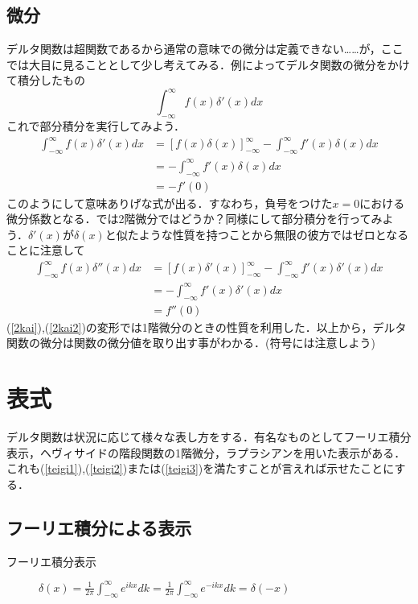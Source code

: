 \documentclass{jsarticle}
\def\kkakko#1{\left[ #1 \right] }
\begin{document}
\subsection{微分}
デルタ関数は超関数であるから通常の意味での微分は定義できない……が，ここでは大目に見ることとして少し考えてみる．例によってデルタ関数の微分をかけて積分したもの
\begin{equation}
\int_{-\infty}^{\infty} f(x)\delta'(x)dx
\end{equation}
これで部分積分を実行してみよう．
\begin{align}
\int_{-\infty}^{\infty} f(x)\delta'(x)dx&=\kkakko{f(x)\delta(x)}_{-\infty}^{\infty} -\int_{-\infty}^{\infty} f'(x)\delta(x)dx\\
&=-\int_{-\infty}^{\infty} f'(x)\delta(x)dx\\
&=-f'(0)
\end{align}
このようにして意味ありげな式が出る．すなわち，負号をつけた$x=0$における微分係数となる．では2階微分ではどうか？同様にして部分積分を行ってみよう．$\delta'(x)$が$\delta(x)$と似たような性質を持つことから無限の彼方ではゼロとなることに注意して
\begin{align}
\int_{-\infty}^{\infty} f(x)\delta''(x)dx&=\kkakko{f(x)\delta'(x)}_{-\infty}^{\infty} -\int_{-\infty}^{\infty} f'(x)\delta'(x)dx\\
\label{2kai}&=-\int_{-\infty}^{\infty} f'(x)\delta'(x)dx\\
\label{2kai2}&=f''(0)
\end{align}
(\ref{2kai}),(\ref{2kai2})の変形では1階微分のときの性質を利用した．以上から，デルタ関数の微分は関数の微分値を取り出す事がわかる．(符号には注意しよう)
\section{表式}
デルタ関数は状況に応じて様々な表し方をする．有名なものとしてフーリエ積分表示，ヘヴィサイドの階段関数の1階微分，ラプラシアンを用いた表示がある．これも(\ref{teigi1}),(\ref{teigi2})または(\ref{teigi3})を満たすことが言えれば示せたことにする．
\subsection{フーリエ積分による表示}

\begin{description}
\item[フーリエ積分表示] $\displaystyle \delta(x)=\frac{1}{2\pi}\int_{-\infty}^{\infty}e^{ikx}dk=\frac{1}{2\pi}\int_{-\infty}^{\infty}e^{-ikx}dk=\delta(-x)$
\end{description}
\end{document}
